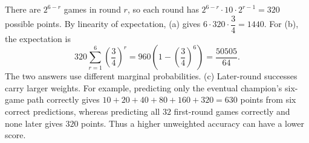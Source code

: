 There are $2^{6-r}$ games in round $r$, so each round has $2^{6-r}\cdot10\cdot2^{r-1}=320$ possible points. By linearity of expectation, (a) gives $6\cdot320\cdot\dfrac{3}{4}=\boxed{1440}$.
For (b), the expectation is
\[320\sum_{r=1}^{6}\left(\dfrac{3}{4}\right)^r=960\left(1-\left(\dfrac{3}{4}\right)^6\right)=\boxed{\dfrac{50505}{64}}.\]
The two answers use different marginal probabilities. (c) Later-round successes carry larger weights. For example, predicting only the eventual champion's six-game path correctly gives $10+20+40+80+160+320=630$ points from six correct predictions, whereas predicting all $32$ first-round games correctly and none later gives $320$ points. Thus a higher unweighted accuracy can have a lower score.

